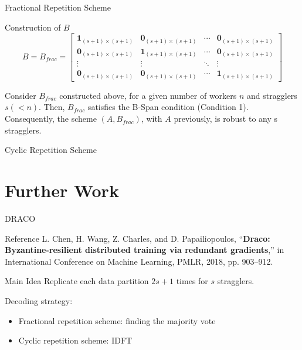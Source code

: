 \documentclass{beamer}
\begin{document}
\begin{frame}{Fractional Repetition Scheme}
    \begin{block}{Construction of $B$}
        \[B = B_{frac} = \begin{bmatrix}
            \boldsymbol{1}_{(s+1)\times (s+1)} & \boldsymbol{0}_{(s+1)\times (s+1)} & \cdots & \boldsymbol{0}_{(s+1)\times (s+1)} \\
            \boldsymbol{0}_{(s+1)\times (s+1)} & \boldsymbol{1}_{(s+1)\times (s+1)} & \cdots & \boldsymbol{0}_{(s+1)\times (s+1)} \\
            \vdots & \vdots & \ddots & \vdots \\
            \boldsymbol{0}_{(s+1)\times (s+1)} & \boldsymbol{0}_{(s+1)\times (s+1)} & \cdots & \boldsymbol{1}_{(s+1)\times (s+1)}
        \end{bmatrix}\]
    \end{block}

    \begin{theorem}
        Consider $B_{frac}$ constructed above, for a given number of workers $n$ and stragglers $s (< n)$. Then, $B_{frac}$ satisfies the B-Span condition (Condition 1). Consequently, the scheme $(A, B_{frac})$, with $A$ previously, is robust to any s stragglers.
    \end{theorem}
\end{frame}

\begin{frame}{Cyclic Repetition Scheme}

\end{frame}

\section{Further Work}

\begin{frame}{DRACO}
    \begin{block}{Reference}
        L. Chen, H. Wang, Z. Charles, and D. Papailiopoulos, “\textbf{Draco: Byzantine-resilient distributed training via redundant gradients},” in International Conference on Machine Learning, PMLR, 2018, pp. 903–912.
    \end{block}

    \begin{block}{Main Idea}
        Replicate each data partition $2s+1$ times for $s$ stragglers.

        Decoding strategy:
        \begin{itemize}
            \item Fractional repetition scheme: finding the majority vote
            \item Cyclic repetition scheme: IDFT
        \end{itemize}
    \end{block}

\end{frame}
\end{document}
